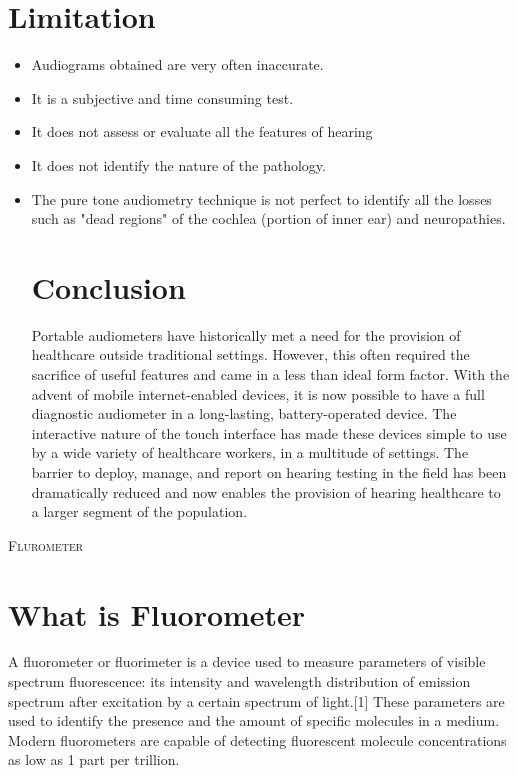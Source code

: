 \documentclass[11pt]{article}
\begin{document}
\section*{Limitation}
\begin{itemize}
\item Audiograms obtained are very often inaccurate.
\item It is a subjective and time consuming test.
\item It does not assess or evaluate all the features of hearing
\item It does not identify the nature of the pathology.
\item The pure tone audiometry technique is not perfect to identify all the losses such as "dead regions" of the cochlea (portion of inner ear) and neuropathies.


\section*{Conclusion}
Portable audiometers have historically met a need for the provision of healthcare outside traditional settings. However, this often required the sacrifice of useful features and came in a less than ideal form factor. With the advent of mobile internet-enabled devices, it is now possible to have a full diagnostic audiometer in a long-lasting, battery-operated device. The interactive nature of the touch interface has made these devices simple to use by a wide variety of healthcare workers, in a multitude of settings. The barrier to deploy, manage, and report on hearing testing in the field has been dramatically reduced and now enables the provision of hearing healthcare to a larger segment of the population.


\end{itemize}


\clearpage
\newpage
\textsc{\LARGE Flurometer}\\[1.5cm]

\section*{What is Fluorometer}
A fluorometer or fluorimeter is a device used to measure parameters of visible spectrum fluorescence: its intensity and wavelength distribution of emission spectrum after excitation by a certain spectrum of light.[1] These parameters are used to identify the presence and the amount of specific molecules in a medium. Modern fluorometers are capable of detecting fluorescent molecule concentrations as low as 1 part per trillion.
\end{document}
